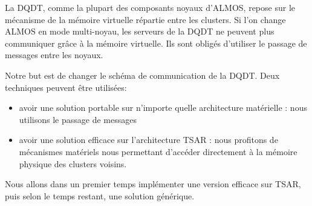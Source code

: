     La DQDT, comme la plupart des composants noyaux d'ALMOS, repose sur le
    mécanisme de la mémoire virtuelle répartie entre les clusters. Si l'on
    change ALMOS en mode multi-noyau, les serveurs de la DQDT ne peuvent plus
    communiquer grâce à la mémoire virtuelle. Ils sont obligés d'utiliser le
    passage de messages entre les noyaux.

    Notre but est de changer le schéma de communication de la DQDT. Deux
    techniques peuvent être utilisées:
    \begin{itemize}
      \item avoir une solution portable sur n'importe quelle architecture
        matérielle : nous utilisons le passage de messages
      \item avoir une solution efficace sur l'architecture TSAR : nous profitons
        de mécanismes matériels nous permettant d'accéder directement à la
        mémoire physique des clusters voisins.
    \end{itemize}

    Nous allons dans un premier temps implémenter une version efficace sur TSAR,
    puis selon le temps restant, une solution générique.
